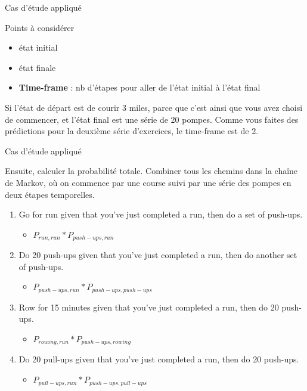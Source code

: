 \documentclass[aspectratio=169,xcolor=dvipsnames, t]{beamer}
\begin{document}
\begin{frame}{Cas d'étude appliqué}
	
	
	\begin{block}{Points à considérer}
		\begin{itemize}
			\item état initial
			\item état finale
			\item \textbf{Time-frame} : nb d'étapes pour aller de l'état initial à l'état final
		\end{itemize}
	\end{block}
	
	\begin{examples}
		Si l'état de départ est de courir 3 miles, parce que c'est ainsi que vous avez choisi de commencer, et l'état final est une série de 20 pompes. Comme vous faites des prédictions pour la deuxième série d'exercices, le time-frame est de 2.
	\end{examples}
	
\end{frame}

\begin{frame}{Cas d'étude appliqué}
	
	Ensuite, calculer la probabilité totale. 
	Combiner tous les chemins dans la chaîne de Markov, où on commence par une course suivi par une série des pompes en deux étapes temporelles.
	\vspace{0.5cm}
	\begin{enumerate}
		\item Go for run given that you’ve just completed a run, then do a set of push-ups.
		\begin{itemize}
			\item $P_{run,run}*P_{push-ups,run}$
		\end{itemize}
		\item Do 20 push-ups given that you’ve just completed a run, then do another set of push-ups.
			\begin{itemize}
			\item $P_{push-ups,run}*P_{push-ups,push-ups}$
			\end{itemize}
		\item Row for 15 minutes given that you’ve just completed a run, then do 20 push-ups.
			\begin{itemize}
			\item $P_{rowing,run}*P_{push-ups,rowing}$
			\end{itemize}
		\item Do 20 pull-ups given that you’ve just completed a run, then do 20 push-ups.
			\begin{itemize}
			\item $P_{pull-ups,run}*P_{push-ups,pull-ups}$
			\end{itemize}
	\end{enumerate}
	
\end{frame}
\end{document}
